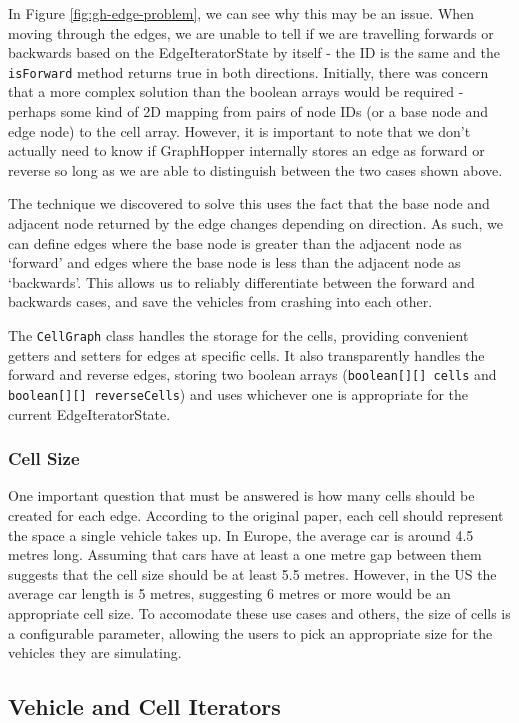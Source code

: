 \documentclass[ %
                    author={Alexander Hill},
                supervisor={Dr. Benjamin Sach},
                    degree={MEng},
                     title={MARMOSET},
                  subtitle={Multi-Agent Route Management using Online Simulation for Efficient Transportation},
                      type={research},
                      year={2016} ]{dissertation}
\begin{document}
In Figure \ref{fig:gh-edge-problem}, we can see why this may be an issue. When
moving through the edges, we are unable to tell if we are travelling forwards or
backwards based on the EdgeIteratorState by itself - the ID is the same and the
\texttt{isForward} method returns true in both directions. Initially, there was
concern that a more complex solution than the boolean arrays would be required -
perhaps some kind of 2D mapping from pairs of node IDs (or a base node and edge
node) to the cell array. However, it is important to note that we don't actually
need to know if GraphHopper internally stores an edge as forward or reverse so
long as we are able to distinguish between the two cases shown above.

The technique we discovered to solve this uses the fact that the base node and
adjacent node returned by the edge changes depending on direction. As such, we
can define edges where the base node is greater than the adjacent node as
`forward' and edges where the base node is less than the adjacent node as
`backwards'. This allows us to reliably differentiate between the forward and
backwards cases, and save the vehicles from crashing into each other.

The \texttt{CellGraph} class handles the storage for the cells, providing
convenient getters and setters for edges at specific cells. It also
transparently handles the forward and reverse edges, storing two boolean arrays
(\texttt{boolean[][] cells} and \texttt{boolean[][] reverseCells}) and uses
whichever one is appropriate for the current EdgeIteratorState.

\subsubsection{Cell Size}\label{sec:cell-size}

One important question that must be answered is how many cells should be created
for each edge. According to the original paper, each cell should represent the
space a single vehicle takes up. In Europe, the average car is around 4.5 metres
long. Assuming that cars have at least a one metre gap between them suggests
that the cell size should be at least 5.5 metres. However, in the US the average car
length is 5 metres, suggesting 6 metres or more would be an appropriate cell
size. To accomodate these use cases and others, the size of cells is a
configurable parameter, allowing the users to pick an appropriate size for the
vehicles they are simulating.

\subsection{Vehicle and Cell Iterators}
\end{document}
